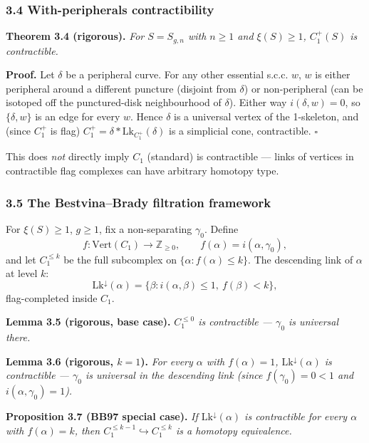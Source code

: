 \documentclass[
]{article}
\begin{document}
\subsubsection{3.4 With-peripherals
contractibility}\label{with-peripherals-contractibility}

\textbf{Theorem 3.4 (rigorous).} \emph{For \(S = S_{g,n}\) with
\(n \ge 1\) and \(\xi(S) \ge 1\), \(C_1^+(S)\) is contractible.}

\textbf{Proof.} Let \(\delta\) be a peripheral curve. For any other
essential s.c.c. \(w\), \(w\) is either peripheral around a different
puncture (disjoint from \(\delta\)) or non-peripheral (can be isotoped
off the punctured-disk neighbourhood of \(\delta\)). Either way
\(i(\delta, w) = 0\), so \(\{\delta, w\}\) is an edge for every \(w\).
Hence \(\delta\) is a universal vertex of the 1-skeleton, and (since
\(C_1^+\) is flag) \(C_1^+ = \delta * \mathrm{Lk}_{C_1^+}(\delta)\) is a
simplicial cone, contractible. \(\square\)

This does \emph{not} directly imply \(C_1\) (standard) is contractible
--- links of vertices in contractible flag complexes can have arbitrary
homotopy type.

\subsubsection{3.5 The Bestvina--Brady filtration
framework}\label{the-bestvinabrady-filtration-framework}

For \(\xi(S) \ge 1\), \(g \ge 1\), fix a non-separating \(\gamma_0\).
Define
\[ f: \mathrm{Vert}(C_1) \to \mathbb Z_{\ge 0}, \qquad f(\alpha) = i(\alpha, \gamma_0), \]
and let \(C_1^{\le k}\) be the full subcomplex on
\(\{\alpha : f(\alpha) \le k\}\). The descending link of \(\alpha\) at
level \(k\):
\[ \mathrm{Lk}^\downarrow(\alpha) = \{\beta : i(\alpha,\beta) \le 1, \ f(\beta) < k\}, \]
flag-completed inside \(C_1\).

\textbf{Lemma 3.5 (rigorous, base case).} \emph{\(C_1^{\le 0}\) is
contractible --- \(\gamma_0\) is universal there.}

\textbf{Lemma 3.6 (rigorous, \(k=1\)).} \emph{For every \(\alpha\) with
\(f(\alpha) = 1\), \(\mathrm{Lk}^\downarrow(\alpha)\) is contractible
--- \(\gamma_0\) is universal in the descending link (since
\(f(\gamma_0) = 0 < 1\) and \(i(\alpha,\gamma_0) = 1\)).}

\textbf{Proposition 3.7 (BB97 special case).} \emph{If
\(\mathrm{Lk}^\downarrow(\alpha)\) is contractible for every \(\alpha\)
with \(f(\alpha) = k\), then
\(C_1^{\le k-1} \hookrightarrow C_1^{\le k}\) is a homotopy
equivalence.}
\end{document}
